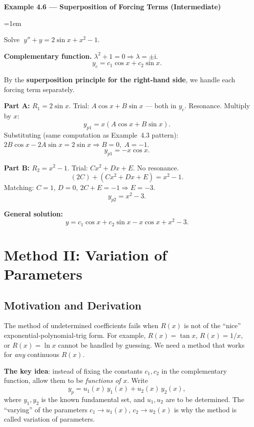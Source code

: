 \documentclass[12pt,a4paper]{article}
\newenvironment{example}[1]{%
  \vspace{0.8em}
  \noindent{\footnotesize\scshape\color{orange!50!black} Example}\par
  \noindent\textbf{#1}\par\vspace{0.3em}
  \begin{list}{}{\leftmargin=1em\rightmargin=0pt}\item
}{%
  \end{list}\vspace{0.8em}
}
\newcommand{\ii}{\mathrm{i}}
\begin{document}

\begin{example}{Example 4.6 --- Superposition of Forcing Terms (Intermediate)}
Solve $\;y'' + y = 2\sin x + x^2 - 1$.

\medskip
\textbf{Complementary function.} $\lambda^2+1=0 \Rightarrow \lambda=\pm\ii$.
\[
  y_c = c_1\cos x + c_2\sin x.
\]

By the \textbf{superposition principle for the right-hand side}, we handle each
forcing term separately.

\textbf{Part A:} $R_1 = 2\sin x$. Trial: $A\cos x + B\sin x$ --- both in $y_c$.
Resonance. Multiply by $x$:
\[
  y_{p1} = x(A\cos x + B\sin x).
\]
Substituting (same computation as Example~4.3 pattern):
$2B\cos x - 2A\sin x = 2\sin x \Rightarrow B=0,\; A=-1$.
\[
  y_{p1} = -x\cos x.
\]

\textbf{Part B:} $R_2 = x^2 - 1$. Trial: $Cx^2+Dx+E$. No resonance.
\[
  (2C) + (Cx^2+Dx+E) = x^2-1.
\]
Matching: $C=1$, $D=0$, $2C+E=-1 \Rightarrow E=-3$.
\[
  y_{p2} = x^2 - 3.
\]

\textbf{General solution:}
\[
  \boxed{y = c_1\cos x + c_2\sin x - x\cos x + x^2 - 3.}
\]
\end{example}

\section{Method II: Variation of Parameters}

\subsection{Motivation and Derivation}

The method of undetermined coefficients fails when $R(x)$ is not of the
``nice'' exponential-polynomial-trig form. For example, $R(x) = \tan x$,
$R(x) = 1/x$, or $R(x) = \ln x$ cannot be handled by guessing. We need a
method that works for \emph{any} continuous $R(x)$.

\textbf{The key idea}: instead of fixing the constants $c_1, c_2$ in the
complementary function, allow them to be \emph{functions of $x$}. Write
\[
  y_p = u_1(x)\,y_1(x) + u_2(x)\,y_2(x),
\]
where $y_1, y_2$ is the known fundamental set, and $u_1, u_2$ are to be
determined. The ``varying'' of the parameters $c_1 \to u_1(x)$,
$c_2 \to u_2(x)$ is why the method is called variation of parameters.
\end{document}
